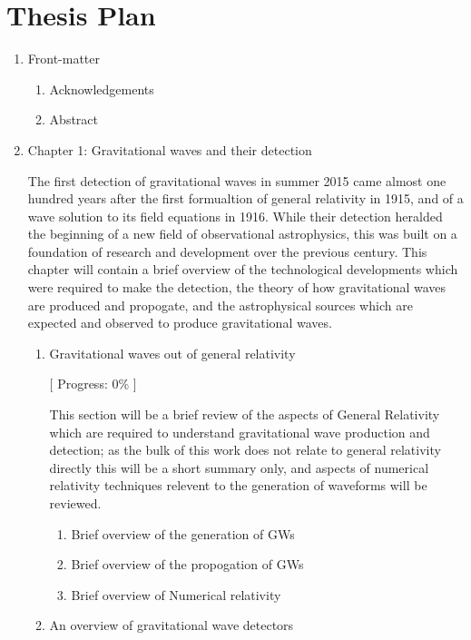 \documentclass[openleft]{kentigern}
\theoremstyle{definition}
\begin{document}
\chapter{Thesis Plan}
\chapterprecis{}

\begin{enumerate}
\item Front-matter
  \begin{enumerate}
    \item Acknowledgements
    \item Abstract
  \end{enumerate}
\item Chapter 1: Gravitational waves and their detection
  
  The first detection of gravitational waves in summer 2015 came
  almost one hundred years after the first formualtion of general
  relativity in 1915, and of a wave solution to its field equations
  in 1916. While their detection heralded the beginning of a new field
  of observational astrophysics, this was built on a foundation of
  research and development over the previous century. This chapter
  will contain a brief overview of the technological developments
  which were required to make the detection, the theory of how
  gravitational waves are produced and propogate, and the
  astrophysical sources which are expected and observed to produce
  gravitational waves.
  \begin{enumerate}
  \item Gravitational waves out of general relativity
    
    [ Progress: 0\% ]
    
    This section will be a brief review of the aspects of General
    Relativity which are required to understand gravitational wave
    production and detection; as the bulk of this work does not relate
    to general relativity directly this will be a short summary only,
    and aspects of numerical relativity techniques relevent to the
    generation of waveforms will be reviewed.
    \begin{enumerate}
    \item Brief overview of the generation of GWs
     \item Brief overview of the propogation of GWs
     \item Brief overview of Numerical relativity
    \end{enumerate}

    
 \item An overview of gravitational wave detectors


\end{enumerate}
\end{enumerate}
\end{document}
